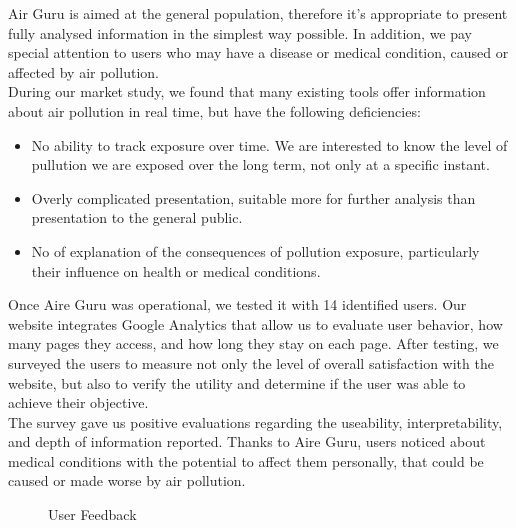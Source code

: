 Air Guru is aimed at the general population, therefore it's appropriate to present fully analysed information in the simplest way possible.
In addition, we pay special attention to users who may have a
disease or medical condition, caused or affected by air pollution.\\

During our market study, we found that many existing tools offer information about air pollution in real time, but have the following deficiencies:
\begin{itemize}
    \item No ability to track exposure over time. We are interested to know the level of pullution we are exposed over the long term, not only at a specific instant.
    \item Overly complicated presentation, suitable more for further analysis than presentation to the general public.
    \item No of explanation of the consequences of pollution exposure, particularly their influence on health or medical conditions.
\end{itemize}

Once Aire Guru was operational, we tested it with 14 identified users. Our website integrates Google Analytics that allow us to evaluate
user behavior, how many pages they access, and how long they stay on each page.
After testing, we surveyed the users to measure not only the level of overall satisfaction with the website,
but also to verify the utility and determine if the user was able to achieve their objective.\\

The survey gave us positive evaluations regarding the useability, interpretability, and depth of information reported. 
Thanks to Aire Guru, users noticed about medical conditions with the potential to affect them personally, that could be caused or made worse by air pollution.\\

\begin{figure}[ht]
    \centering
    \hfill
    \caption{User Feedback}
\end{figure}